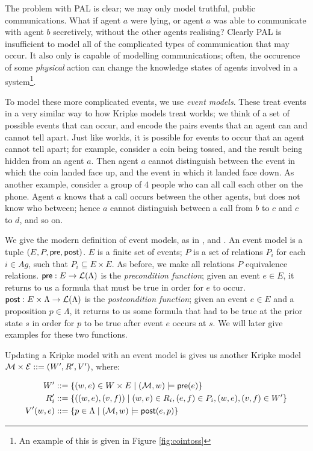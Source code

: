 \documentclass[10pt, a4paper]{report}
\begin{document}
The problem with PAL is clear; we may only model truthful, public
communications. What if agent $a$ were lying, or agent $a$ was able to
communicate with agent $b$ secretively, without the other agents realising?
Clearly PAL is insufficient to model all of the complicated types of
communication that may occur. It also only is capable of modelling
communications; often, the occurence of some \emph{physical} action can change
the knowledge states of agents involved in a system\footnote{An example of this
  is given in Figure \ref{fig:cointoss}}. 

To model these more complicated events, we use \emph{event models}. These treat
events in a very similar way to how Kripke models treat worlds; we think of a
set of possible events that can occur, and encode the pairs events that an agent
can and cannot tell apart. Just like worlds, it is possible for events to occur
that an agent cannot tell apart; for example, consider a coin being tossed, and
the result being hidden from an agent $a$. Then agent $a$ cannot distinguish
between the event in which the coin landed face up, and the event in which it
landed face down. As another example, consider a group of 4 people who can all
call each other on the phone. Agent $a$ knows that a call occurs between the
other agents, but does not know who between; hence $a$ cannot distinguish
between a call from $b$ to $c$ and $c$ to $d$, and so on.

We give the modern definition of event models, as in \cite{MalvinThesis}, and
\cite{AutomataTechniques}. An event model  is a tuple $(E, P, \textsf{pre},
\textsf{post})$. $E$ is a finite set of events; $P$ is a set of relations $P_i$ for each
$i \in Ag$, such that $P_i \subseteq E \times E$. As before, we make all
relations $P$ equivalence relations. $\textsf{pre} : E \rightarrow \mathcal{L}(\Lambda) $ is
the \emph{precondition function}; given an event $e \in E$, it returns to us a
formula that must be true in order for $e$ to occur. $\textsf{post} : E \times \Lambda
\rightarrow \mathcal{L}(\Lambda)$ is the \emph{postcondition function}; given an
event $e \in E$ and a proposition $p \in \Lambda$, it returns to us some formula
that had to be true at the prior state $s$ in order for $p$ to be true after
event $e$ occurs at $s$. We will later give examples for these two functions.

Updating a Kripke model  with an event model  is gives us another
Kripke model $\mathcal{M} \times \mathcal{E} ::= (W', R', V')$, where:

\begin{align*}
  W'   &::= \left\{(w, e) \in W \times E \mid (\mathcal{M}, w) \models \textsf{pre}(e)\right\} \\
  R_i' &::= \left\{((w, e), (v, f)) \mid (w, v) \in R_i, (e, f) \in P_i, (w, e), (v, f) \in W' \right\} \\
  V'(w, e) &::= \left\{ p \in \Lambda \mid (\mathcal{M}, w) \models \textsf{post}(e, p) \right\}
\end{align*}
\end{document}
